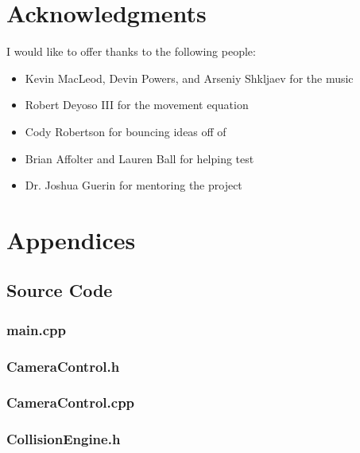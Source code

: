 \documentclass{article}
\begin{document}
\section{Acknowledgments} \label{sec:acknowledge}

I would like to offer thanks to the following people:

\begin{itemize}
	\item Kevin MacLeod, Devin Powers, and Arseniy Shkljaev for the music
	\item Robert Deyoso III for the movement equation
	\item Cody Robertson for bouncing ideas off of
	\item Brian Affolter and Lauren Ball for helping test
	\item Dr. Joshua Guerin for mentoring the project
\end{itemize}

\section{Appendices}

\subsection{Source Code} \label{subsec:source}

\subsubsection{main.cpp}
	
 				
\subsubsection{CameraControl.h}
	

\subsubsection{CameraControl.cpp}
	
					
\subsubsection{CollisionEngine.h}
	
					
\end{document}
